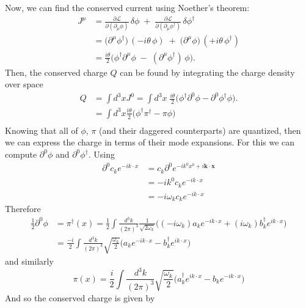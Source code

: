 \documentclass[12pt]{article}
\newcommand{\del}{\partial}
\newcommand{\+}{\dagger}
\begin{document}
Now, we can find the conserved current using Noether's theorem:
\begin{align*}
   J^\mu
   &= \frac{\partial \mathcal{L}}{\partial(\del_\mu \phi)}\,\delta\phi
     \;+\; \frac{\partial \mathcal{L}}{\partial(\del_\mu \phi^\dagger)}\,\delta\phi^\dagger \\
   &= \big(\del^\mu\phi^\dagger\big)\,(-i\theta\,\phi)
     \;+\; \big(\del^\mu\phi\big)\,(+i\theta\,\phi^\dagger) \\
   &= \frac{i\theta}{2}\Big(\phi^\dagger \del^\mu \phi \;-\; (\del^\mu\phi^\dagger)\,\phi\Big).
\end{align*}
Then, the conserved charge $Q$ can be found by integrating the charge density
over space
\begin{align*}
    Q &= \int d^3x J^{0} = \int d^3x \; \frac{i\theta}{2}\Big(\phi^\dagger \del^0 \phi -
    \del^0\phi^\dagger\phi\Big). \\
      &= \int d^3x \frac{i\theta}{2} \Big(\phi^{\dagger}\pi^{\dagger} - \pi\phi \Big) \\
\end{align*}
Knowing that all of $\phi$, $\pi$ (and their daggered counterparts) are quantized,
then we can express the charge in terms of their mode expansions. For this we
can compute $\del^0\phi$ and $\del^0\phi^{\dagger}$. Using 
\begin{align*}
    \del^0 c_k e^{-ik\cdot x} &= c_k \del^0 e^{-ik^0x^0 + i\mathbf{k} \cdot \mathbf{x}} \\
                              &= -i k^0 c_k e^{-ik\cdot x} \\
                              &= -i \omega_k c_k e^{-ik\cdot x}
\end{align*}
Therefore
\begin{align*}
    \tfrac12\del^0\phi &= \pi^{\dagger}(x) = \tfrac12 \int \frac{d^3k}{(2\pi)^3}
    \frac{1}{\sqrt{2\omega_k}} \Big((-i\omega_k) a_k e^{-ik\cdot x} +
    (i\omega_k) b^{\dagger}_k e^{ik\cdot x} \Big) \\
                       &= \frac{-i}{2} \int \frac{d^3k}{(2\pi)^3}
                       \sqrt{\frac{\omega_k}{2}}\Big(a_ke^{-ik\cdot x}
                           - b^{\dagger}_ke^{ik\cdot x} \Big)
\end{align*}
and similarly
\begin{equation*}
    \pi(x) = \frac{i}{2} \int \frac{d^3k}{(2\pi)^3} \sqrt{\frac{\omega_k}{2}}
    \Big(a^{\dagger}_ke^{ik\cdot x} - b_ke^{-ik\cdot x} \Big)
\end{equation*}
And so the conserved charge is given by
\end{document}
